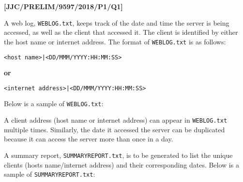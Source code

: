 \item \textbf{{[}JJC/PRELIM/9597/2018/P1/Q1{]} }

A web log, \texttt{WEBLOG.txt}, keeps track of the date and time the
server is being accessed, as well as the client that accessed it.
The client is identified by either the host name or internet address.
The format of \texttt{WEBLOG.txt} is as follows: 
\noindent \begin{center}
\texttt{<host name>|<DD/MMM/YYYY:HH:MM:SS> }
\par\end{center}

\noindent \begin{center}
\textbf{or }
\par\end{center}

\noindent \begin{center}
\texttt{<internet address>|<DD/MMM/YYYY:HH:MM:SS>} 
\par\end{center}

Below is a sample of \texttt{WEBLOG.txt}: 

\noindent{}

A client address (host name or internet address) can appear in \texttt{WEBLOG.txt}
multiple times. Similarly, the date it accessed the server can be
duplicated because it can access the server more than once in a day. 

A summary report, \texttt{SUMMARYREPORT.txt}, is to be generated to
list the unique clients (hosts name/internet address) and their corresponding
dates. Below is a sample of \texttt{SUMMARYREPORT.txt}: 

\noindent{} 

